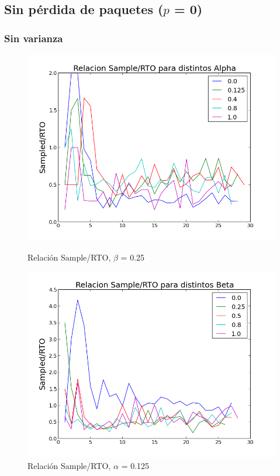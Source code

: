 \subsection{Sin pérdida de paquetes ($p$ = 0)}

\subsubsection{Sin varianza}

\begin{figure}[H]
\begin{minipage}{0.5\linewidth}
\includegraphics[width=\linewidth]{../graficos/alphavar0drop0.png}
\caption{Relación Sample/RTO, $\beta$ = 0.25}\label{fig:alpha-var0-drop0}
\end{minipage}
\hfill
\begin{minipage}{0.5\linewidth}
\includegraphics[width=\linewidth]{../graficos/betavar0drop0.png}
\caption{Relación Sample/RTO, $\alpha$ = 0.125}\label{fig:beta-var0-drop0}
\end{minipage}
\end{figure}

